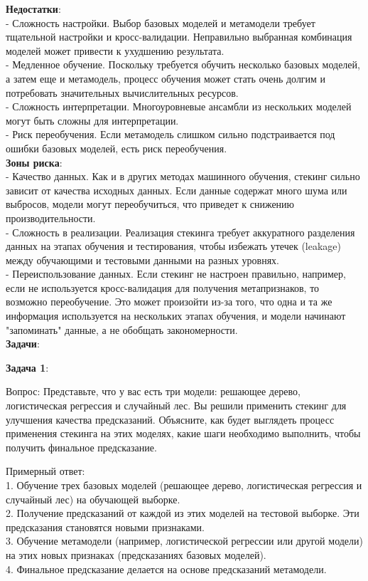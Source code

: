 \textbf{Недостатки}:\\
- Сложность настройки. Выбор базовых моделей и метамодели требует тщательной настройки и кросс-валидации. Неправильно выбранная комбинация моделей может привести к ухудшению результата.\\
- Медленное обучение. Поскольку требуется обучить несколько базовых моделей, а затем еще и метамодель, процесс обучения может стать очень долгим и потребовать значительных вычислительных ресурсов.\\
- Сложность интерпретации. Многоуровневые ансамбли из нескольких моделей могут быть сложны для интерпретации.\\
- Риск переобучения. Если метамодель слишком сильно подстраивается под ошибки базовых моделей, есть риск переобучения.\\

\textbf{Зоны риска}:\\
- Качество данных. Как и в других методах машинного обучения, стекинг сильно зависит от качества исходных данных. Если данные содержат много шума или выбросов, модели могут переобучиться, что приведет к снижению производительности.\\
- Сложность в реализации. Реализация стекинга требует аккуратного разделения данных на этапах обучения и тестирования, чтобы избежать утечек (leakage) между обучающими и тестовыми данными на разных уровнях. \\
- Переиспользование данных. Если стекинг не настроен правильно, например, если не используется кросс-валидация для получения метапризнаков, то возможно переобучение. Это может произойти из-за того, что одна и та же информация используется на нескольких этапах обучения, и модели начинают "запоминать" данные, а не обобщать закономерности.\\

\textbf{Задачи}:

\textbf{Задача 1}:

Вопрос: Представьте, что у вас есть три модели: решающее дерево, логистическая регрессия и случайный лес. Вы решили применить стекинг для улучшения качества предсказаний. Объясните, как будет выглядеть процесс применения стекинга на этих моделях, какие шаги необходимо выполнить, чтобы получить финальное предсказание.

Примерный ответ: \\
1. Обучение трех базовых моделей (решающее дерево, логистическая регрессия и случайный лес) на обучающей выборке.\\
2. Получение предсказаний от каждой из этих моделей на тестовой выборке. Эти предсказания становятся новыми признаками.\\
3. Обучение метамодели (например, логистической регрессии или другой модели) на этих новых признаках (предсказаниях базовых моделей).\\
4. Финальное предсказание делается на основе предсказаний метамодели.


